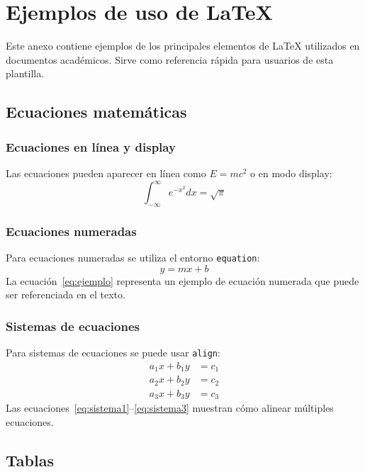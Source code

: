 
\chapter{Ejemplos de uso de \LaTeX}
\label{app:latex}

Este anexo contiene ejemplos de los principales elementos de \LaTeX{} utilizados en documentos académicos. Sirve como referencia rápida para usuarios de esta plantilla.

\section{Ecuaciones matemáticas}

\subsection{Ecuaciones en línea y display}
Las ecuaciones pueden aparecer en línea como $E = mc^2$ o en modo display:
\[
\int_{-\infty}^{\infty} e^{-x^2} dx = \sqrt{\pi}
\]

\subsection{Ecuaciones numeradas}
Para ecuaciones numeradas se utiliza el entorno \texttt{equation}:
\begin{equation}
  \label{eq:ejemplo}
  y = mx + b
\end{equation}
La ecuación~\eqref{eq:ejemplo} representa un ejemplo de ecuación numerada que puede ser referenciada en el texto.

\subsection{Sistemas de ecuaciones}
Para sistemas de ecuaciones se puede usar \texttt{align}:
\begin{align}
  a_1 x + b_1 y &= c_1 \label{eq:sistema1} \\
  a_2 x + b_2 y &= c_2 \label{eq:sistema2} \\
  a_3 x + b_3 y &= c_3 \label{eq:sistema3}
\end{align}
Las ecuaciones~\eqref{eq:sistema1}--\eqref{eq:sistema3} muestran cómo alinear múltiples ecuaciones.

\section{Tablas}

